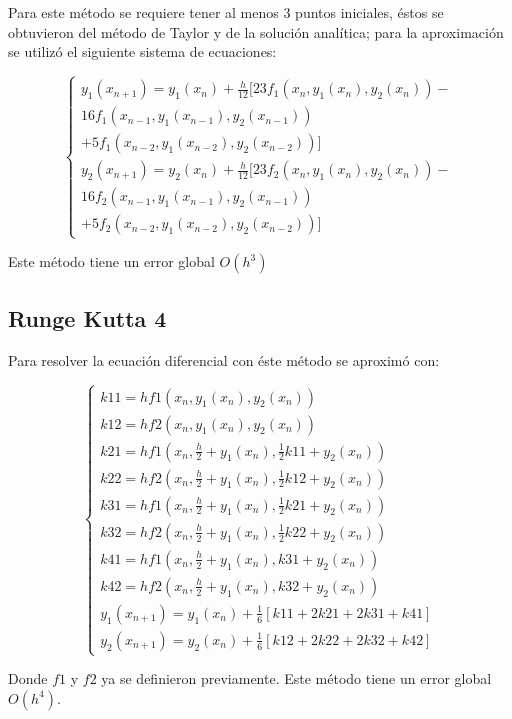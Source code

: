 \documentclass[letterpaper, 10 pt, conference]{ieeeconf}  %
\begin{document}
Para este m\'etodo se requiere tener al menos 3 puntos iniciales, \'estos se obtuvieron del m\'etodo de Taylor y de la soluci\'on anal\'itica; para la aproximaci\'on se utiliz\'o el siguiente sistema de ecuaciones:

\[ \begin{cases} y_1(x_{n+1}) = y_1(x_n) + \frac{h}{12}[23f_1(x_n, y_1(x_n), y_2(x_n)) - \\ 16f_1(x_{n-1}, y_1(x_{n-1}), y_2(x_{n-1})) \\ + 5f_1(x_{n-2}, y_1(x_{n-2}), y_2(x_{n-2}))] \\ y_2(x_{n+1}) = y_2(x_n) + \frac{h}{12}[23f_2(x_n, y_1(x_n), y_2(x_n)) - \\ 16f_2(x_{n-1}, y_1(x_{n-1}), y_2(x_{n-1})) \\ + 5f_2(x_{n-2}, y_1(x_{n-2}), y_2(x_{n-2}))] \end{cases} \]

Este m\'etodo tiene un error global $O(h^3)$

\subsection{Runge Kutta 4}

Para resolver la ecuaci\'on diferencial con \'este m\'etodo se aproxim\'o con:

\[ \begin{cases} 
    k11 = hf1(x_n, y_1(x_n), y_2(x_n)) \\
    k12 = hf2(x_n, y_1(x_n), y_2(x_n)) \\
    k21 = hf1(x_n, \frac{h}{2} + y_1(x_n), \frac{1}{2}k11 + y_2(x_n)) \\
    k22 = hf2(x_n, \frac{h}{2} + y_1(x_n), \frac{1}{2}k12 + y_2(x_n)) \\
    k31 = hf1(x_n, \frac{h}{2} + y_1(x_n), \frac{1}{2}k21 + y_2(x_n)) \\
    k32 = hf2(x_n, \frac{h}{2} + y_1(x_n), \frac{1}{2}k22 + y_2(x_n)) \\
    k41 = hf1(x_n, \frac{h}{2} + y_1(x_n), k31 + y_2(x_n)) \\
    k42 = hf2(x_n, \frac{h}{2} + y_1(x_n), k32 + y_2(x_n)) \\
    y_1(x_{n+1}) = y_1(x_n) + \frac{1}{6}[k11 + 2k21 + 2k31 + k41] \\
    y_2(x_{n+1}) = y_2(x_n) + \frac{1}{6}[k12 + 2k22 + 2k32 + k42]

\end{cases} \]

    Donde $f1$ y $f2$ ya se definieron previamente. Este m\'etodo tiene un error global $O(h^4)$.
\end{document}
